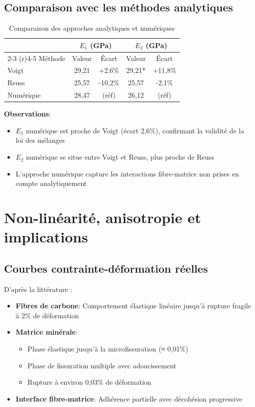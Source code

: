 \documentclass{rapportECL}
\begin{document}
\subsection{Comparaison avec les méthodes analytiques}

\begin{table}[h]
\centering
\caption{Comparaison des approches analytiques et numériques}
\begin{tabular}{lcccc}
\toprule
& \multicolumn{2}{c}{$E_1$ (GPa)} & \multicolumn{2}{c}{$E_2$ (GPa)} \\
\cmidrule(r){2-3} \cmidrule(r){4-5}
Méthode & Valeur & Écart & Valeur & Écart \\
\midrule
Voigt & 29,21 & +2,6\% & 29,21* & +11,8\% \\
Reuss & 25,57 & -10,2\% & 25,57 & -2,1\% \\
Numérique & 28,47 & (réf) & 26,12 & (réf) \\
\bottomrule
\end{tabular}
\end{table}

\textbf{Observations}:
\begin{itemize}
\item $E_1$ numérique est proche de Voigt (écart 2,6\%), confirmant la validité de la loi des mélanges
\item $E_2$ numérique se situe entre Voigt et Reuss, plus proche de Reuss
\item L'approche numérique capture les interactions fibre-matrice non prises en compte analytiquement
\end{itemize}

\section{Non-linéarité, anisotropie et implications}

\subsection{Courbes contrainte-déformation réelles}

D'après la littérature \cite{Contamine2011,Hartig2010}:

\begin{itemize}
\item \textbf{Fibres de carbone}: Comportement élastique linéaire jusqu'à rupture fragile à 2\% de déformation

\item \textbf{Matrice minérale}: 
  \begin{itemize}
  \item Phase élastique jusqu'à la microfissuration (≈ 0,01\%)
  \item Phase de fissuration multiple avec adoucissement
  \item Rupture à environ 0,03\% de déformation
  \end{itemize}

\item \textbf{Interface fibre-matrice}: Adhérence partielle avec décohésion progressive
\end{itemize}
\end{document}
